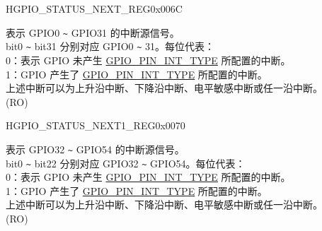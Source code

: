 \begin{register}{H}{GPIO\_STATUS\_NEXT\_REG}{0x006C}\label{regdesc:GPIOSTATUSNEXTREG}
%
\regnewline%
\begin{regdesc}\begin{reglist}
\label{fielddesc:GPIOSTATUSINTERRUPTNEXT}\item [GPIO\_STATUS\_INTERRUPT\_NEXT] 表示 GPIO0 \verb+~+ GPIO31 的中断源信号。\\
bit0 \verb+~+ bit31 分别对应 GPIO0 \verb+~+ 31。每位代表：\\
 0：表示 GPIO 未产生  \hyperref[fielddesc:GPIOPINNINTTYPE]{GPIO\_PIN\_INT\_TYPE} 所配置的中断。\\
1：GPIO 产生了  \hyperref[fielddesc:GPIOPINNINTTYPE]{GPIO\_PIN\_INT\_TYPE} 所配置的中断。\\
上述中断可以为上升沿中断、下降沿中断、电平敏感中断或任一沿中断。\\  (RO)
\end{reglist}\end{regdesc}
\end{register}


\begin{register}{H}{GPIO\_STATUS\_NEXT1\_REG}{0x0070}\label{regdesc:GPIOSTATUSNEXT1REG}
%
%
\regnewline%
\begin{regdesc}\begin{reglist}
\label{fielddesc:GPIOSTATUSINTERRUPTNEXT1}\item [GPIO\_STATUS\_INTERRUPT\_NEXT1] 表示 GPIO32 \verb+~+ GPIO54 的中断源信号。\\
bit0 \verb+~+ bit22 分别对应 GPIO32 \verb+~+ GPIO54。每位代表：\\
 0：表示 GPIO 未产生  \hyperref[fielddesc:GPIOPINNINTTYPE]{GPIO\_PIN\_INT\_TYPE} 所配置的中断。\\
1：GPIO 产生了  \hyperref[fielddesc:GPIOPINNINTTYPE]{GPIO\_PIN\_INT\_TYPE} 所配置的中断。\\
上述中断可以为上升沿中断、下降沿中断、电平敏感中断或任一沿中断。\\  (RO)
\end{reglist}\end{regdesc}
\end{register}


